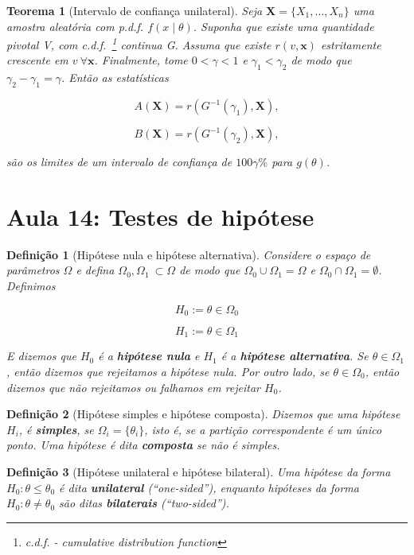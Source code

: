 \documentclass{article}
\newtheorem{theorem}{Teorema}
\newtheorem{definition}{Definição}
\begin{document}
\begin{theorem}[Intervalo de confiança unilateral]
Seja $\textbf{X} = \{ X_1, \ldots, X_n \}$ uma amostra aleatória com p.d.f. $f(x \mid \theta)$. Suponha que existe uma quantidade pivotal V, com c.d.f.~\footnote{c.d.f. - cumulative distribution function} continua G. Assuma que existe $r(v, \textbf{x})$ estritamente crescente em $v \ \forall \textbf{x}$. Finalmente, tome $0 < \gamma < 1$ e $\gamma_1 < \gamma_2$ de modo que $\gamma_2 - \gamma_1 = \gamma$. Então as estatísticas

$$A(\textbf{X}) = r(G^{-1}(\gamma_1), \textbf{X}),$$

$$B(\textbf{X}) = r(G^{-1}(\gamma_2), \textbf{X}),$$

são os limites de um intervalo de confiança de $100\gamma \%$ para $g(\theta)$.
\end{theorem}


\section*{Aula 14: Testes de hipótese}

\begin{definition}[Hipótese nula e hipótese alternativa]
Considere o espaço de parâmetros $\Omega$ e defina $\Omega_0, \Omega_1 \ \subset \Omega$ de modo que $\Omega_0 \cup \Omega_1 = \Omega$ e $\Omega_0 \cap \Omega_1 = \emptyset$. Definimos

$$H_0 := \theta \in \Omega_0$$

$$H_1 := \theta \in \Omega_1$$

E dizemos que $H_0$ é a \textbf{hipótese nula} e $H_1$ é a \textbf{hipótese alternativa}.
Se $\theta \in \Omega_1$, então dizemos que rejeitamos a hipótese nula. Por outro lado, se $\theta \in \Omega_0$, então dizemos que não rejeitamos ou falhamos em rejeitar $H_0$.
\end{definition}

\begin{definition}[Hipótese simples e hipótese composta]
Dizemos que uma hipótese $H_i$, é \textbf{simples}, se $\Omega_i = \{ \theta_i \}$, isto é, se a partição correspondente é um único ponto. Uma hipótese é dita \textbf{composta} se não é simples.
\end{definition}

\begin{definition}[Hipótese unilateral e hipótese bilateral]
Uma hipótese da forma $H_0 : \theta \leq \theta_0$ é dita \textbf{unilateral} (``one-sided''), enquanto hipóteses da forma $H_0 : \theta \neq \theta_0$ são ditas \textbf{bilaterais} (``two-sided'').
\end{definition}
\end{document}
